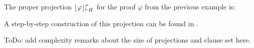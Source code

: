 \begin{example}
\label{example:DProjectionProper}
The proper projection $\projectionProper{\varphi}{\seq H }$ for the proof $\varphi$ from the previous example is:
\begin{scriptsize}
\begin{prooftree}
		 
	 
	 
				 
						 
						 
					 
					 
					 
			 
									 
										 
								  
								 
					  
					 
\end{prooftree}
\end{scriptsize}

\noindent
A step-by-step construction of this projection can be found in \cite{Woltzenlogel-Paleo2009A-General-Analysis-of-Cut-Elimination-by-CERes}.
\hfill\QED
\end{example}

ToDo: add complexity remarks about the size of projections and clause set here.

